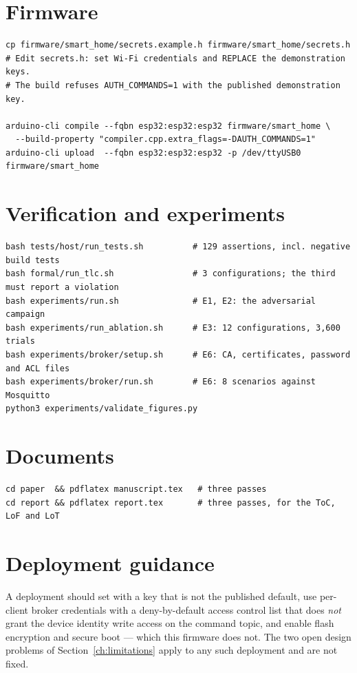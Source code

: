 \section{Firmware}

\begin{lstlisting}[style=sh]
cp firmware/smart_home/secrets.example.h firmware/smart_home/secrets.h
# Edit secrets.h: set Wi-Fi credentials and REPLACE the demonstration keys.
# The build refuses AUTH_COMMANDS=1 with the published demonstration key.

arduino-cli compile --fqbn esp32:esp32:esp32 firmware/smart_home \
  --build-property "compiler.cpp.extra_flags=-DAUTH_COMMANDS=1"
arduino-cli upload  --fqbn esp32:esp32:esp32 -p /dev/ttyUSB0 firmware/smart_home
\end{lstlisting}

\section{Verification and experiments}

\begin{lstlisting}[style=sh]
bash tests/host/run_tests.sh          # 129 assertions, incl. negative build tests
bash formal/run_tlc.sh                # 3 configurations; the third must report a violation
bash experiments/run.sh               # E1, E2: the adversarial campaign
bash experiments/run_ablation.sh      # E3: 12 configurations, 3,600 trials
bash experiments/broker/setup.sh      # E6: CA, certificates, password and ACL files
bash experiments/broker/run.sh        # E6: 8 scenarios against Mosquitto
python3 experiments/validate_figures.py
\end{lstlisting}

\section{Documents}

\begin{lstlisting}[style=sh]
cd paper  && pdflatex manuscript.tex   # three passes
cd report && pdflatex report.tex       # three passes, for the ToC, LoF and LoT
\end{lstlisting}

\section{Deployment guidance}

A deployment should set  with a key that is not the published default,
use per-client broker credentials with a deny-by-default access control list that does
\emph{not} grant the device identity write access on the command topic, and enable flash
encryption and secure boot --- which this firmware does not. The two open design problems of
Section~\ref{ch:limitations} apply to any such deployment and are not fixed.

